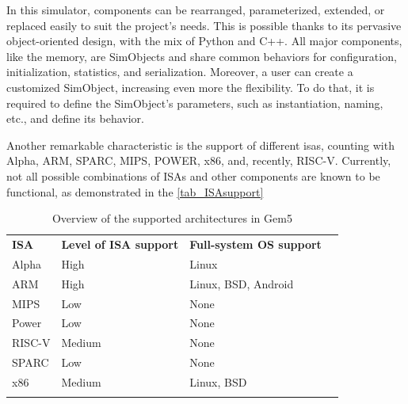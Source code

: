 In this simulator, components can be rearranged, parameterized, extended, or replaced easily to suit the project's needs. This is possible 
thanks to its pervasive object-oriented design, with the mix of Python and C++. All major components, like the memory, are SimObjects and 
share common behaviors for configuration, initialization, statistics, and serialization. Moreover, a user can create a customized SimObject, 
increasing even more the flexibility. To do that, it is required to define the SimObject's parameters, such as instantiation, 
naming, etc., and define its behavior.

Another remarkable characteristic is the support of different \glspl{isa}, counting with Alpha, ARM, SPARC, MIPS, POWER, x86, and, recently, 
RISC-V. Currently, not all possible combinations of ISAs and other components are known to be functional, as demonstrated in the 
\autoref{tab_ISAsupport}

\begin{table}[H]
\centering
\begin{tabular}{llll}
\cline{1-3}
\multicolumn{1}{|l|}{\cellcolor[HTML]{9B9B9B}\textbf{ISA}} & \multicolumn{1}{l|}{\cellcolor[HTML]{9B9B9B}\textbf{Level of ISA support}} & \multicolumn{1}{l|}{\cellcolor[HTML]{9B9B9B}\textbf{Full-system OS support}} &  \\ \cline{1-3}
\multicolumn{1}{|l|}{Alpha} & \multicolumn{1}{l|}{High} & \multicolumn{1}{l|}{Linux} &  \\ \cline{1-3}
\multicolumn{1}{|l|}{ARM} & \multicolumn{1}{l|}{High} & \multicolumn{1}{l|}{Linux, BSD, Android} &  \\ \cline{1-3}
\multicolumn{1}{|l|}{MIPS} & \multicolumn{1}{l|}{Low} & \multicolumn{1}{l|}{None} &  \\ \cline{1-3}
\multicolumn{1}{|l|}{Power} & \multicolumn{1}{l|}{Low} & \multicolumn{1}{l|}{None} &  \\ \cline{1-3}
\multicolumn{1}{|l|}{RISC-V} & \multicolumn{1}{l|}{Medium} & \multicolumn{1}{l|}{None} &  \\ \cline{1-3}
\multicolumn{1}{|l|}{SPARC} & \multicolumn{1}{l|}{Low} & \multicolumn{1}{l|}{None} &  \\ \cline{1-3}
\multicolumn{1}{|l|}{x86} & \multicolumn{1}{l|}{Medium} & \multicolumn{1}{l|}{Linux, BSD} &  \\ \cline{1-3}
 &  &  & 
\end{tabular}
\caption{Overview of the supported architectures in Gem5 \cite{hempelsimulation}}
\label{tab_ISAsupport}
\end{table}

